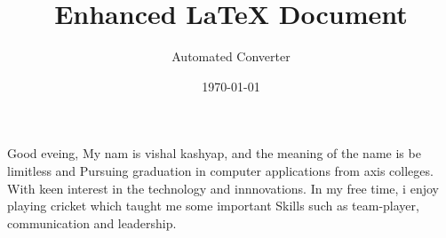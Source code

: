 \documentclass{article}
\title{Enhanced LaTeX Document}
\author{Automated Converter}
\date{\today}
\begin{document}
\maketitle

\onehalfspacing

Good eveing,
My nam is vishal kashyap, and the meaning of the name is be limitless and
Pursuing graduation in computer applications from axis colleges.
With keen interest in the technology and innnovations.
In my free time, i enjoy playing cricket which taught me some important
Skills such as team-player, communication and leadership.
\end{document}

